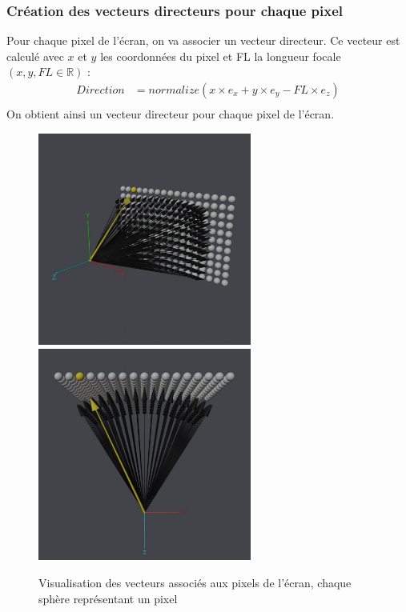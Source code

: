 \subsubsection{Création des vecteurs directeurs pour chaque pixel}
Pour chaque pixel de l'écran, on va associer un vecteur directeur. Ce vecteur est calculé avec $x$ et $y$ les coordonnées du pixel et FL la longueur focale $(x,y,FL\in \mathbb{R})$ : 
\begin{align*}
    Direction &= normalize(x\times e_x + y\times e_y - FL\times e_z)\\
\end{align*}
\noindent
On obtient ainsi un vecteur directeur pour chaque pixel de l'écran.
\begin{figure}[h]
    \centering
    \includegraphics[width=7cm]{images/vectorscreen1.jpg}
    \includegraphics[width=7cm]{images/vectorscreen2.jpg}
    \caption{Visualisation des vecteurs associés aux pixels de l'écran, chaque sphère représentant un pixel }
    \label{fig:screenvectors}
\end{figure}